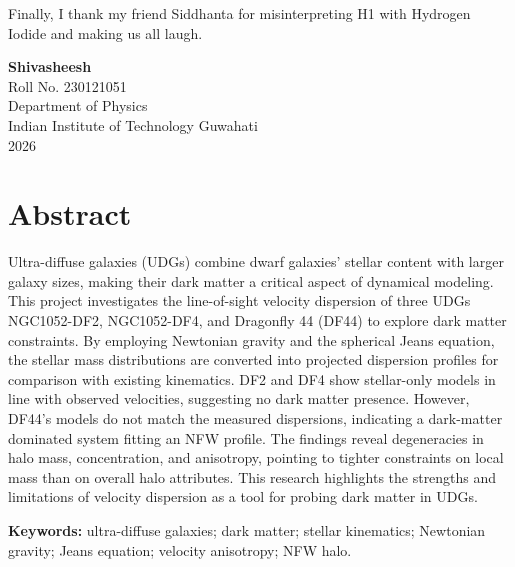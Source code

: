 \documentclass[12pt,a4paper]{report}
\numberwithin{equation}{chapter}
\newcommand{\authorname}{Shivasheesh}
\newcommand{\rollnumber}{230121051}
\newcommand{\department}{Department of Physics}
\newcommand{\institute}{Indian Institute of Technology Guwahati}
\newcommand{\thesisyear}{2026}
\begin{document}
Finally, I thank my friend Siddhanta for misinterpreting H1 with Hydrogen Iodide and making us all laugh.

\vfill
\begin{flushright}
\textbf{\authorname}\\
Roll No. \rollnumber\\
\department\\
\institute\\
\thesisyear
\end{flushright}

\clearpage
\chapter*{Abstract}
Ultra-diffuse galaxies (UDGs) combine dwarf galaxies' stellar content with larger galaxy sizes, making their dark matter a critical aspect of dynamical modeling. This project investigates the line-of-sight velocity dispersion of three UDGs NGC1052-DF2, NGC1052-DF4, and Dragonfly 44 (DF44) to explore dark matter constraints. By employing Newtonian gravity and the spherical Jeans equation, the stellar mass distributions are converted into projected dispersion profiles for comparison with existing kinematics. DF2 and DF4 show stellar-only models in line with observed velocities, suggesting no dark matter presence. However, DF44's models do not match the measured dispersions, indicating a dark-matter dominated system fitting an NFW profile. The findings reveal degeneracies in halo mass, concentration, and anisotropy, pointing to tighter constraints on local mass than on overall halo attributes. This research highlights the strengths and limitations of velocity dispersion as a tool for probing dark matter in UDGs.

\vspace{0.4cm}
\noindent\textbf{Keywords:} ultra-diffuse galaxies; dark matter; stellar kinematics; Newtonian gravity; Jeans equation; velocity anisotropy; NFW halo.

\clearpage
\tableofcontents
\clearpage
\listoffigures
\clearpage
\end{document}
